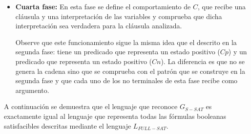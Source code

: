 \documentclass[12pt]{article}
\begin{document}
\begin{itemize}
    \item \textbf{Cuarta fase:} En esta fase se define el comportamiento de $C$, que recibe una cláusula y una
          interpretación de las variables y comprueba que dicha interpretación sea verdadera para la cláusula analizada.
          \begin{enumerate}[start=23]
          \end{enumerate}
          
          Observe que este funcionamiento sigue la misma idea que el descrito en la segunda fase: tiene un predicado que representa un estado positivo ($Cp$) y un predicado que representa un estado positivo ($Cn$). La diferencia es que no se genera la cadena sino que se comprueba con el patrón que se construye en la segunda fase y que cada uno de los no terminales de esta fase recibe como argumento.        
\end{itemize}

A continuación se demuestra que el lenguaje que reconoce $G_{S-SAT}$ es exactamente igual al lenguaje que representa todas las fórmulas booleanas satisfacibles descritas mediante el lenguaje $L_{FULL-SAT}$.
\end{document}

